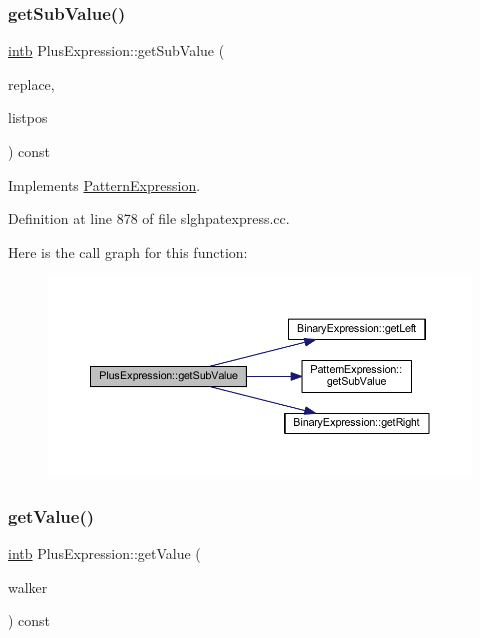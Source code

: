 \subsubsection{\texorpdfstring{getSubValue()}{getSubValue()}}
{\footnotesize\ttfamily \mbox{\hyperlink{types_8h_aa925ba3e627c2df89d5b1cfe84fb8572}{intb}} Plus\+Expression\+::get\+Sub\+Value (\begin{DoxyParamCaption}\item[{const vector$<$ \mbox{\hyperlink{types_8h_aa925ba3e627c2df89d5b1cfe84fb8572}{intb}} $>$ \&}]{replace,  }\item[{int4 \&}]{listpos }\end{DoxyParamCaption}) const\hspace{0.3cm}{\ttfamily [virtual]}}



Implements \mbox{\hyperlink{class_pattern_expression_ade37db4aa76dd442b189bf4a6bb2d9dd}{Pattern\+Expression}}.



Definition at line 878 of file slghpatexpress.\+cc.

Here is the call graph for this function\+:
\nopagebreak
\begin{figure}[H]
\begin{center}
\leavevmode
\includegraphics[width=350pt]{class_plus_expression_a28a9c3cb49bb8515b6edc4e191beecfa_cgraph}
\end{center}
\end{figure}
\mbox{\label{class_plus_expression_af0089a678032ff29d411865ede9fd94e}} 
\subsubsection{\texorpdfstring{getValue()}{getValue()}}
{\footnotesize\ttfamily \mbox{\hyperlink{types_8h_aa925ba3e627c2df89d5b1cfe84fb8572}{intb}} Plus\+Expression\+::get\+Value (\begin{DoxyParamCaption}\item[{\mbox{\hyperlink{class_parser_walker}{Parser\+Walker}} \&}]{walker }\end{DoxyParamCaption}) const\hspace{0.3cm}{\ttfamily [virtual]}}



